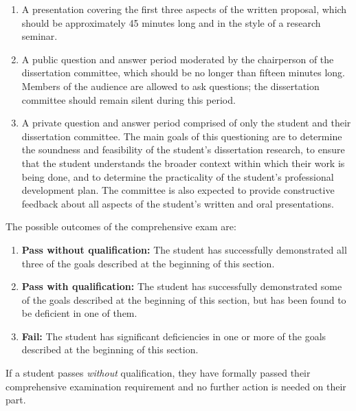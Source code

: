 \begin{enumerate}
\item  A presentation covering the first three aspects of the written
  proposal, which should be approximately 45 minutes long and in the
  style of a research seminar.

\item  A public question and answer period moderated by the
  chairperson of the dissertation committee, which should be no longer than
  fifteen minutes long.  Members of the audience are allowed to ask
  questions; the dissertation committee should remain silent during this
  period.

\item  A private question and answer period comprised of only the
  student and their dissertation committee.  The main goals of this
  questioning are to determine the soundness and feasibility of the
  student's dissertation research, to ensure that the student
  understands the broader context within which their work is being
  done, and to determine the practicality of the student's
  professional development plan.  The committee is also expected to
  provide constructive feedback about all aspects of the student's
  written and oral presentations.

\end{enumerate}

\vspace{2mm}
\noindent
The possible outcomes of the comprehensive exam are:

\begin{enumerate}
\item  \textbf{Pass without qualification:} The student has
  successfully demonstrated all three of the goals described at the
  beginning of this section.

\item  \textbf{Pass with qualification:} The student has successfully
  demonstrated some of the goals described at the beginning of this
  section, but has been found to be deficient in one of them.  

\item  \textbf{Fail:} The student has significant deficiencies in one
  or more of the goals described at the beginning of this section.

\end{enumerate}

If a student passes \textit{without} qualification, they have formally
passed their comprehensive examination requirement and no further
action is needed on their part.

